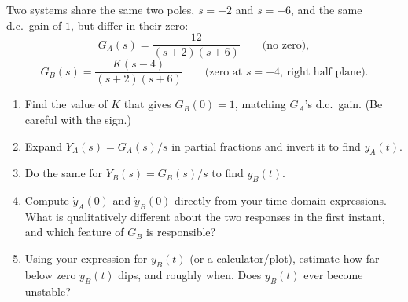 \documentclass[11pt,a4paper]{article}
\begin{document}
Two systems share the same two poles, $s=-2$ and $s=-6$, and the same
d.c.\ gain of $1$, but differ in their zero:
\[
  G_A(s)=\frac{12}{(s+2)(s+6)}
  \qquad\text{(no zero)},
\]
\[
  G_B(s)=\frac{K(s-4)}{(s+2)(s+6)}
  \qquad\text{(zero at }s=+4\text{, right half plane)}.
\]

\begin{enumerate}[label=(\alph*)]
\item Find the value of $K$ that gives $G_B(0)=1$, matching $G_A$'s d.c.\
      gain. (Be careful with the sign.)
\item Expand $Y_A(s)=G_A(s)/s$ in partial fractions and invert it to find
      $y_A(t)$.
\item Do the same for $Y_B(s)=G_B(s)/s$ to find $y_B(t)$.
\item Compute $\dot y_A(0)$ and $\dot y_B(0)$ directly from your time-domain
      expressions. What is qualitatively different about the two responses in
      the first instant, and which feature of $G_B$ is responsible?
\item Using your expression for $y_B(t)$ (or a calculator/plot), estimate how
      far below zero $y_B(t)$ dips, and roughly when. Does $y_B(t)$ ever
      become unstable?
\end{enumerate}
\end{document}
